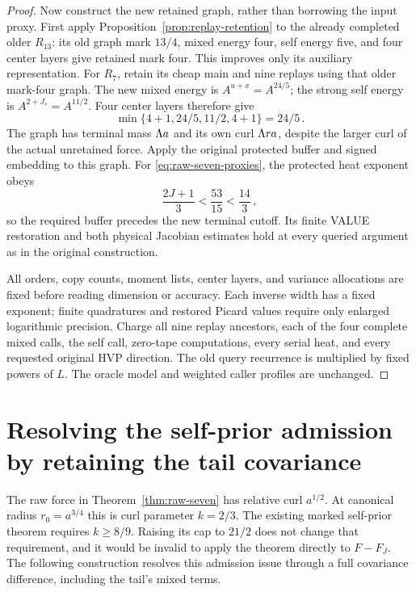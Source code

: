 \documentclass[11pt]{article}
\numberwithin{equation}{section}
\theoremstyle{remark}\newtheorem{remark}[theorem]{Remark}
\begin{document}
\begin{proof}
Now construct the new retained graph, rather than borrowing the
input proxy. First apply Proposition~\ref{prop:replay-retention}
to the already completed older $R_{13}$: its old graph mark $13/4$,
mixed energy four, self energy five, and four center layers give
retained mark four. This improves only its auxiliary representation.
For $R_7$, retain its cheap main and nine replays using that older
mark-four graph. The new mixed energy is $A^{u+x}=A^{24/5}$;
the strong self energy is $A^{2+J_s}=A^{11/2}$.
Four center layers therefore give
\[
 \min\{4+1,24/5,11/2,4+1\}=24/5\,.
\]
The graph has terminal mass $\Lambda a$ and its own curl $\Lambda ra$,
despite the larger curl of the actual unretained force. Apply the
original protected buffer and signed embedding to this graph. For
\eqref{eq:raw-seven-proxies}, the protected heat exponent obeys
\[
 \frac{2J+1}{3}<\frac{53}{15}<\frac{14}{3}\,,
\]
so the required buffer precedes the new terminal cutoff. Its finite
VALUE restoration and both physical Jacobian estimates hold at
every queried argument as in the original construction.

All orders, copy counts, moment lists, center layers, and variance
allocations are fixed before reading dimension or accuracy. Each
inverse width has a fixed exponent; finite quadratures and restored
Picard values require only enlarged logarithmic precision. Charge
all nine replay ancestors, each of the four complete mixed calls,
the self call, zero-tape computations, every serial heat, and every
requested original HVP direction. The old query recurrence is
multiplied by fixed powers of $L$. The oracle model and weighted
caller profiles are unchanged.
\end{proof}



\section{Resolving the self-prior admission by retaining the tail covariance}
\label{sec:tail-admission}
The raw force in Theorem~\ref{thm:raw-seven} has relative curl
$a^{1/2}$. At canonical radius $r_0=a^{3/4}$ this is curl parameter
$k=2/3$. The existing marked self-prior theorem requires $k\ge8/9$.
Raising its cap to $21/2$ does not change that requirement, and it
would be invalid to apply the theorem directly to $F-F_J$.
The following construction resolves this admission issue through
a full covariance difference, including the tail's mixed terms.
\end{document}
